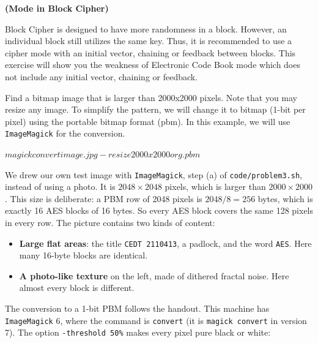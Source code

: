 \documentclass[a4paper, 10pt]{article}
\begin{document}
\begin{problem}
\textbf{(Mode in Block Cipher)}
\par Block Cipher is designed to have more randomness in a block.
However, an individual block still utilizes the same key.
Thus, it is recommended to use a cipher mode with an initial vector, chaining or feedback between blocks.
This exercise will show you the weakness of Electronic Code Book mode
which does not include any initial vector, chaining or feedback.
\begin{subproblems_alpha}
	\item Find a bitmap image that is larger than 2000x2000 pixels.
	      Note that you may resize any image.
	      To simplify the pattern, we will change it to bitmap (1-bit per pixel) using the portable bitmap format (pbm).
	      In this example, we will use \texttt{ImageMagick} for the conversion.
	      \begin{codingbox}[language=bash, deletekeywords={in}]
$ magick convert image.jpg -resize 2000x2000 org.pbm
$
\end{codingbox}
	      \myspace[v][3][mm]
	      \begin{solution}
		      We drew our own test image with \texttt{ImageMagick}, step (a) of \texttt{code/problem3.sh}, instead of using a photo.
		      It is $2048 \times 2048$ pixels, which is larger than $2000 \times 2000$.
		      This size is deliberate: a PBM row of 2048 pixels is $2048 / 8 = 256$ bytes, which is exactly 16 AES blocks of 16 bytes.
		      So every AES block covers the same 128 pixels in every row.
		      The picture contains two kinds of content:
		      \begin{itemize}
			      \item \textbf{Large flat areas}: the title \texttt{CEDT 2110413}, a padlock, and the word \texttt{AES}. Here many 16-byte blocks are identical.
			      \item \textbf{A photo-like texture} on the left, made of dithered fractal noise. Here almost every block is different.
		      \end{itemize}
		      The conversion to a 1-bit PBM follows the handout.
		      This machine has \texttt{ImageMagick} 6, where the command is \texttt{convert} (it is \texttt{magick convert} in version 7).
		      The option \texttt{-threshold 50\%} makes every pixel pure black or white:

\end{solution}
\end{subproblems_alpha}
\end{problem}
\end{document}
